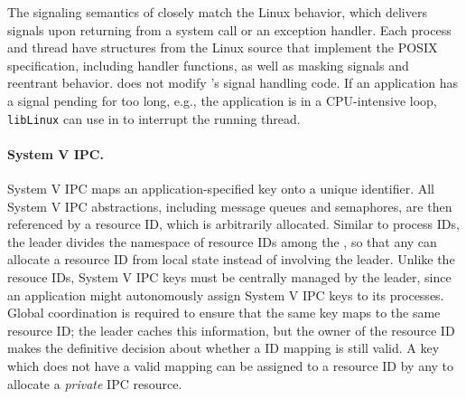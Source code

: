 The signaling semantics of \thelibos{} closely match the Linux behavior, which
delivers signals upon returning from a system call
or an exception handler.
Each process and thread have  structures from the Linux source 
that implement the
POSIX specification, including handler functions, as well as masking signals and
reentrant behavior.
\thelibos{} does not modify \libc{}'s signal handling code. %
If an application has a signal pending for too long,
e.g., the application is in a CPU-intensive loop, {\tt libLinux} can use  in \thehostabi{} to interrupt the running thread. 




\begin{comment}
\graphene{} internally indexes point-to-point handles using PIDs.
In order to facilitate reallocation of PIDs without global coordination, 
\graphene{}-internal PIDs also include a {\em generation number},
allowing \picoprocs{} to lazily detect reuse similar to generation numbers 
for inodes in NFS~\cite{sandberg85nfs}.
\end{comment}

\paragraph{System V IPC.} System V IPC
maps an application-specified key onto a unique identifier.
All System V IPC abstractions, including message queues and semaphores,
are then referenced by a resource ID, which is arbitrarily allocated.
Similar to process IDs, 
the leader divides the namespace of resource IDs among the \picoprocs{},
so that any \picoproc{}
can allocate a resource ID from local state instead of involving the leader. %
Unlike the resouce IDs, System V IPC keys must be centrally managed
by the leader,
since an application might autonomously assign System V IPC keys to its processes.
Global coordination is required to ensure that the same key maps to the same resource ID;
the leader caches this information, but the owner of the resource ID 
makes the definitive decision about whether a ID mapping is still valid.
A key which does not have a valid mapping can be assigned to a resource ID by any \picoproc{} to allocate a {\em private} IPC resource.



